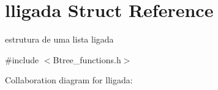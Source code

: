 \hypertarget{structlligada}{}\section{lligada Struct Reference}
\label{structlligada}


estrutura de uma lista ligada  




{\ttfamily \#include $<$Btree\+\_\+functions.\+h$>$}



Collaboration diagram for lligada\+:
